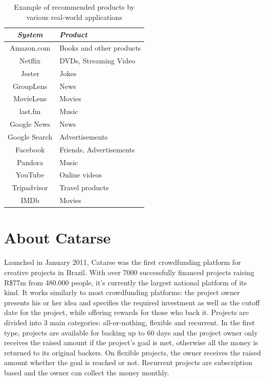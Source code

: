 \documentclass[cic,tc,english]{iiufrgs}
\begin{document}
\begin{table}[h]
    \caption{Example of recommended products by various real-world applications}
    \centering
        \begin{tabular}{c|p{5cm}}
          \hline
          \textit{System}  &   \textit{Product}  \\
          \hline
          \hline
Amazon.com   & Books and other products  \\
Netflix  & DVDs, Streaming Video  \\
Jester  & Jokes  \\
GroupLens  & News  \\
MovieLens  & Movies  \\
last.fm  & Music  \\
Google News  & News  \\
Google Search  & Advertisements  \\
Facebook  & Friends, Advertisements  \\
Pandora  & Music  \\
YouTube  & Online videos  \\
Tripadvisor  & Travel products  \\
IMDb  & Movies  \\
          \hline
        \end{tabular}
    \label{tbl:system_examples}
\end{table}

\section{About Catarse}
Launched in January 2011, Catarse was the first crowdfunding platform for creative projects in Brazil. With over 7000 successfully financed projects raising R\$77m from 480.000 people, it's currently the largest national platform of its kind. It works similarly to most crowdfunding platforms: the project owner presents his or her idea and specifies the required investment as well as the cutoff date for the project, while offering rewards for those who back it. Projects are divided into 3 main categories: all-or-nothing, flexible and recurrent. In the first type, projects are available for backing up to 60 days and the project owner only receives the raised amount if the project's goal is met, otherwise all the money is returned to its original backers. On flexible projects, the owner receives the raised amount whether the goal is reached or not. Recurrent projects are subscription based and the owner can collect the money monthly.
\end{document}
